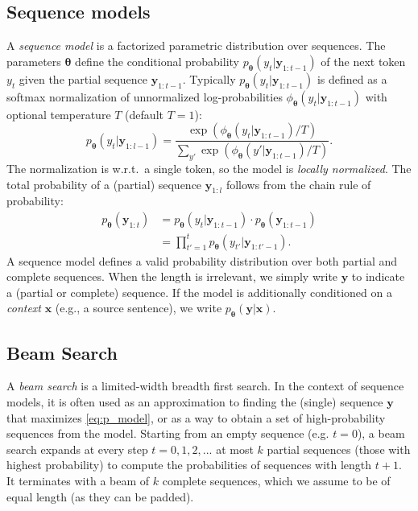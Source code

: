 \subsection{Sequence models}
A \emph{sequence model} is a factorized parametric distribution over sequences. The parameters $\bm{\theta}$ define the conditional probability $p_{\bm{\theta}}(y_t | \bm{y}_{1:t-1})$ of the next token $y_t$ given the partial sequence $\bm{y}_{1:t-1}$. Typically $p_{\bm{\theta}}(y_t | \bm{y}_{1:t-1})$ is defined as a softmax normalization of unnormalized log-probabilities $\phi_{\bm{\theta}}(y_t | \bm{y}_{1:t-1})$ with optional temperature $T$ (default $T = 1$):
\begin{equation}
\label{eq:softmax}
    p_{\bm{\theta}}(y_t | \bm{y}_{1:l-1}) = \frac{\exp{(\phi_{\bm{\theta}}(y_t | \bm{y}_{1:t-1})/T)}}{\sum_{y'} \exp{(\phi_{\bm{\theta}}(y' | \bm{y}_{1:t-1})/T)}}.
\end{equation}
The normalization is w.r.t.\ a single token, so the model is \emph{locally normalized}. The total probability of a (partial) sequence $\bm{y}_{1:l}$ follows from the chain rule of probability:
\begin{align}
	p_{\bm{\theta}}(\bm{y}_{1:t}) &= p_{\bm{\theta}}(y_t | \bm{y}_{1:t-1}) \cdot p_{\bm{\theta}}(\bm{y}_{1:t-1}) \label{eq:p_model_incremental} \\
	&= \prod\limits_{t'=1}^{t} p_{\bm{\theta}}(y_{t'} | \bm{y}_{1:t'-1}).
	\label{eq:p_model}
\end{align}
A sequence model defines a valid probability distribution over both partial and complete sequences. When the length is irrelevant, we simply write $\bm{y}$ to indicate a (partial or complete) sequence. If the model is additionally conditioned on a \emph{context} $\bm{x}$ (e.g., a source sentence), we write $p_{\bm{\theta}}(\bm{y}|\bm{x})$.

\subsection{Beam Search}
A \emph{beam search} is a limited-width breadth first search. In the context of sequence models, it is often used as an approximation to finding the (single) sequence $\bm{y}$ that maximizes \eqref{eq:p_model}, or as a way to obtain a set of high-probability sequences from the model. Starting from an empty sequence (e.g. $t = 0$), a beam search expands at every step $t = 0, 1, 2, ...$ at most $k$ partial sequences (those with highest probability) to compute the probabilities of sequences with length $t + 1$. It terminates with a beam of $k$ complete sequences, which we assume to be of equal length (as they can be padded).

